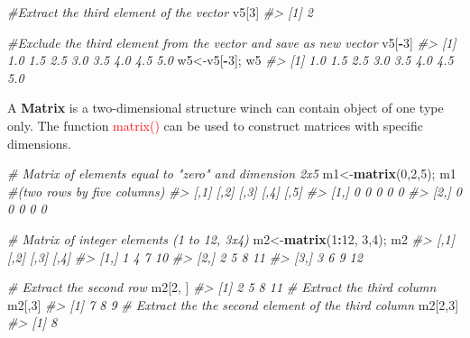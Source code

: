\documentclass[
]{book}
\newenvironment{Shaded}{\begin{snugshade}}{\end{snugshade}}
\newcommand{\CommentTok}[1]{\textcolor[rgb]{0.56,0.35,0.01}{\textit{#1}}}
\newcommand{\DecValTok}[1]{\textcolor[rgb]{0.00,0.00,0.81}{#1}}
\newcommand{\FunctionTok}[1]{\textcolor[rgb]{0.13,0.29,0.53}{\textbf{#1}}}
\newcommand{\NormalTok}[1]{#1}
\newcommand{\OtherTok}[1]{\textcolor[rgb]{0.56,0.35,0.01}{#1}}
\newcommand{\SpecialCharTok}[1]{\textcolor[rgb]{0.81,0.36,0.00}{\textbf{#1}}}
\theoremstyle{definition}
\theoremstyle{definition}
\theoremstyle{definition}
\theoremstyle{definition}
\theoremstyle{remark}
\begin{document}
\begin{Shaded}
\begin{Highlighting}[]
\CommentTok{\#Extract the third element of the vector}
\NormalTok{v5[}\DecValTok{3}\NormalTok{]}
\CommentTok{\#\textgreater{} [1] 2}

\CommentTok{\#Exclude the third element from the vector and save as new vector}
\NormalTok{v5[}\SpecialCharTok{{-}}\DecValTok{3}\NormalTok{]}
\CommentTok{\#\textgreater{} [1] 1.0 1.5 2.5 3.0 3.5 4.0 4.5 5.0}
\NormalTok{w5}\OtherTok{\textless{}{-}}\NormalTok{v5[}\SpecialCharTok{{-}}\DecValTok{3}\NormalTok{]; w5}
\CommentTok{\#\textgreater{} [1] 1.0 1.5 2.5 3.0 3.5 4.0 4.5 5.0}
\end{Highlighting}
\end{Shaded}

A \textbf{Matrix} is a two-dimensional structure winch can contain object of one type only.
The function \textcolor{red}{matrix()} can be used to construct matrices with specific dimensions.

\begin{Shaded}
\begin{Highlighting}[]

\CommentTok{\# Matrix of elements equal to "zero" and dimension 2x5 }
\NormalTok{m1}\OtherTok{\textless{}{-}}\FunctionTok{matrix}\NormalTok{(}\DecValTok{0}\NormalTok{,}\DecValTok{2}\NormalTok{,}\DecValTok{5}\NormalTok{); m1  }\CommentTok{\#(two rows by five columns)}
\CommentTok{\#\textgreater{}      [,1] [,2] [,3] [,4] [,5]}
\CommentTok{\#\textgreater{} [1,]    0    0    0    0    0}
\CommentTok{\#\textgreater{} [2,]    0    0    0    0    0}

\CommentTok{\# Matrix of integer elements (1 to 12, 3x4) }
\NormalTok{m2}\OtherTok{\textless{}{-}}\FunctionTok{matrix}\NormalTok{(}\DecValTok{1}\SpecialCharTok{:}\DecValTok{12}\NormalTok{, }\DecValTok{3}\NormalTok{,}\DecValTok{4}\NormalTok{); m2 }
\CommentTok{\#\textgreater{}      [,1] [,2] [,3] [,4]}
\CommentTok{\#\textgreater{} [1,]    1    4    7   10}
\CommentTok{\#\textgreater{} [2,]    2    5    8   11}
\CommentTok{\#\textgreater{} [3,]    3    6    9   12}

\CommentTok{\# Extract the second row}
\NormalTok{m2[}\DecValTok{2}\NormalTok{, ]}
\CommentTok{\#\textgreater{} [1]  2  5  8 11}
\CommentTok{\# Extract the third column}
\NormalTok{m2[,}\DecValTok{3}\NormalTok{]}
\CommentTok{\#\textgreater{} [1] 7 8 9}
\CommentTok{\# Extract the the second element of the third column}
\NormalTok{m2[}\DecValTok{2}\NormalTok{,}\DecValTok{3}\NormalTok{]}
\CommentTok{\#\textgreater{} [1] 8}
\end{Highlighting}
\end{Shaded}
\end{document}
